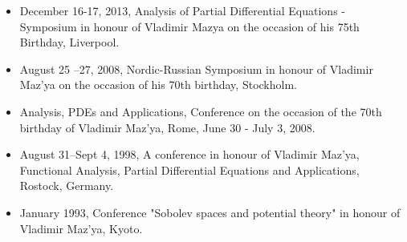 \documentclass{article}
\begin{document}
\medskip

  
\begin{itemize}
\item December 16-17, 2013, Analysis of Partial Differential Equations - Symposium in honour of  Vladimir Mazya on the occasion of his 75th Birthday, Liverpool.
\item  August 25 --27, 2008, Nordic-Russian Symposium in honour of Vladimir Maz'ya on the occasion of his 70th birthday, Stockholm.
\item Analysis, PDEs and Applications, Conference on the occasion of the 70th birthday of Vladimir Maz'ya, Rome, June 30 - July 3, 2008.
       \item August 31--Sept 4, 1998,  A
conference in honour of Vladimir 
  Maz'ya, Functional Analysis, Partial Differential Equations and 
  Applications, Rostock, Germany.
\item January 1993, Conference "Sobolev spaces and potential theory" in honour of Vladimir Maz'ya, Kyoto.
\end{itemize}



\medskip

\end{document}
